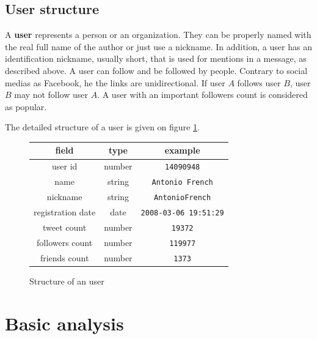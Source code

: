 \documentclass[a4paper,twoside,12pt,openright]{report}
\begin{document}
\newpage

\subsection{User structure}
A \textbf{user} represents a person or an organization. They can be properly named with the real full name of the author or just use a nickname. In addition, a user has an identification nickname, usually short, that is used for mentions in a message, as described above. A user can follow and be followed by people. Contrary to social medias as Facebook, he the links are unidirectional. If user $A$ follows user $B$, user $B$ may not follow user $A$. A user with an important followers count is considered as popular.

The detailed structure of a user is given on figure \ref{structUser}.

\begin{figure}[h!]
\centering
\begin{tabular}{ccc}
field & type & example\\
\hline
\hline
user id & number & \texttt{14090948} \\ \hline
name & string & \texttt{Antonio French} \\ \hline
nickname & string & \texttt{AntonioFrench} \\ \hline
registration date & date & \texttt{2008-03-06 19:51:29} \\ \hline
tweet count & number & \texttt{19372} \\ \hline
followers count & number & \texttt{119977} \\ \hline
friends count & number & \texttt{1373} \\ \hline \hline
\end{tabular}
\caption{Structure of an user}
\label{structUser}
\end{figure}


\newpage

\section{Basic analysis}
\end{document}
